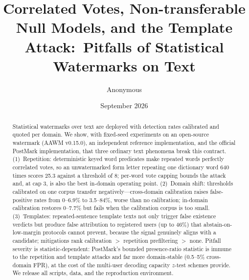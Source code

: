 \documentclass[11pt]{article}
\title{Correlated Votes, Non-transferable Null Models, and the Template
Attack:\ Pitfalls of Statistical Watermarks on Text}
\author{Anonymous}
\date{September 2026}
\begin{document}
\maketitle

\begin{abstract}
Statistical watermarks over text are deployed with detection rates
calibrated and quoted per domain. We show, with fixed-seed experiments on
an open-source watermark (AAWM v0.15.0), an independent reference
implementation, and the official PostMark implementation, that three
ordinary text phenomena break this contract. (1)~Repetition: deterministic
keyed word predicates make repeated words perfectly correlated votes, so an
unwatermarked form letter repeating one dictionary word 640 times scores
25.3 against a threshold of 8; per-word vote capping bounds the attack and,
at cap 3, is also the best in-domain operating point. (2)~Domain shift:
thresholds calibrated on one corpus transfer negatively---cross-domain
calibration raises false-positive rates from 0--6.9\% to 3.5--84\%, worse
than no calibration; in-domain calibration restores 0--7.7\% but fails when
the calibration corpus is too small. (3)~Templates: repeated-sentence
template texts not only trigger false existence verdicts but produce false
attribution to registered users (up to 46\%) that abstain-on-low-margin
protocols cannot prevent, because the signal genuinely aligns with a
candidate; mitigations rank calibration $>$ repetition prefiltering
$>$ none. Pitfall severity is statistic-dependent: PostMark's bounded
presence-ratio statistic is immune to the repetition and template attacks
and far more domain-stable (0.5--5\% cross-domain FPR), at the cost of the
multi-user decoding capacity $z$-test schemes provide. We release all
scripts, data, and the reproduction environment.
\end{abstract}













\appendix

\end{document}
